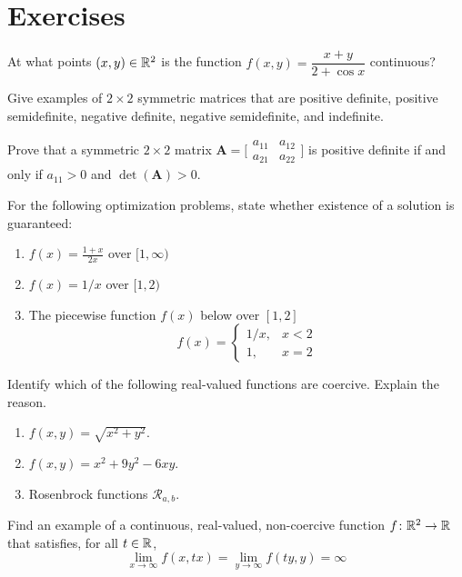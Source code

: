 
\section*{Exercises}
\begin{problem}
At what points $(x,y) \in \mathbb{R}^2$ is the function $f(x,y) = \dfrac{x+y}{2+\cos x}$ continuous?
\end{problem}

\begin{problem}
Give examples of $2 \times 2$ symmetric matrices that are positive definite, positive semidefinite, negative definite, negative semidefinite, and indefinite.
\end{problem}

\begin{problem}
Prove that a symmetric $2\times 2$ matrix $\boldsymbol{A} = \big[ \begin{smallmatrix} a_{11} & a_{12} \\ a_{21} & a_{22} \end{smallmatrix} \big]$ is positive definite if and only if $a_{11}>0$ and $\det(\boldsymbol{A})>0$.
\end{problem}

\begin{problem}
For the following optimization problems, state whether existence of a solution is guaranteed:
\begin{enumerate}
	\item $f(x) = \frac{1+x}{2x}$ over $[1,\infty)$
	\item $f(x) = 1/x$ over $[1,2)$
	\item The piecewise function $f(x)$ below over $[1,2]$
	\begin{equation*}
	f(x) = \begin{cases}
	1/x, &x<2 \\
	1,   &x=2
	\end{cases}
	\end{equation*}
\end{enumerate}
\end{problem}

\begin{problem}
Identify which of the following real-valued functions are coercive.  Explain the reason.
\begin{enumerate}
	\item $f(x,y) = \sqrt{x^2+y^2}$.
	\item $f(x,y) = x^2 + 9y^2 - 6xy$.
	\item Rosenbrock functions $\mathcal{R}_{a,b}$.
\end{enumerate}
\end{problem}

\begin{problem}
Find an example of a continuous, real-valued, non-coercive function $f\colon \mathbb{R}^2 \to \mathbb{R}$ that satisfies, for all $t \in \mathbb{R}$,
\begin{equation*}
\lim_{x \to \infty} f(x, tx) = \lim_{y \to \infty} f(ty, y) = \infty
\end{equation*}
\end{problem}

